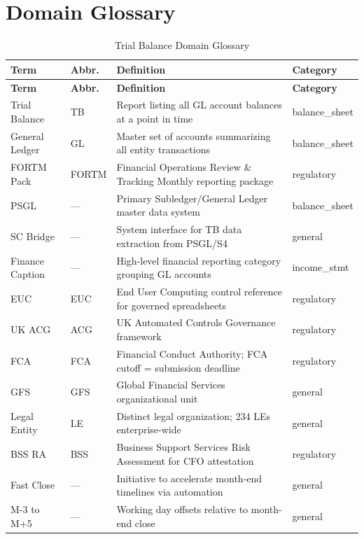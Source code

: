\documentclass[11pt,a4paper]{article}
\begin{document}
\newpage
\section{Domain Glossary}
\label{sec:glossary}

\begin{longtable}{lp{2cm}p{8.5cm}l}
\caption{Trial Balance Domain Glossary} \\
\toprule
\textbf{Term} & \textbf{Abbr.} & \textbf{Definition} & \textbf{Category} \\
\midrule
\endfirsthead
\toprule
\textbf{Term} & \textbf{Abbr.} & \textbf{Definition} & \textbf{Category} \\
\midrule
\endhead
Trial Balance & TB & Report listing all GL account balances at a point in time & balance\_sheet \\
\midrule
General Ledger & GL & Master set of accounts summarizing all entity transactions & balance\_sheet \\
\midrule
FORTM Pack & FORTM & Financial Operations Review \& Tracking Monthly reporting package & regulatory \\
\midrule
PSGL & --- & Primary Subledger/General Ledger master data system & balance\_sheet \\
\midrule
SC Bridge & --- & System interface for TB data extraction from PSGL/S4 & general \\
\midrule
Finance Caption & --- & High-level financial reporting category grouping GL accounts & income\_stmt \\
\midrule
EUC & EUC & End User Computing control reference for governed spreadsheets & regulatory \\
\midrule
UK ACG & ACG & UK Automated Controls Governance framework & regulatory \\
\midrule
FCA & FCA & Financial Conduct Authority; FCA cutoff = submission deadline & regulatory \\
\midrule
GFS & GFS & Global Financial Services organizational unit & general \\
\midrule
Legal Entity & LE & Distinct legal organization; 234 LEs enterprise-wide & general \\
\midrule
BSS RA & BSS & Business Support Services Risk Assessment for CFO attestation & regulatory \\
\midrule
Fast Close & --- & Initiative to accelerate month-end timelines via automation & general \\
\midrule
M-3 to M+5 & --- & Working day offsets relative to month-end close & general \\
\bottomrule
\end{longtable}
\end{document}
